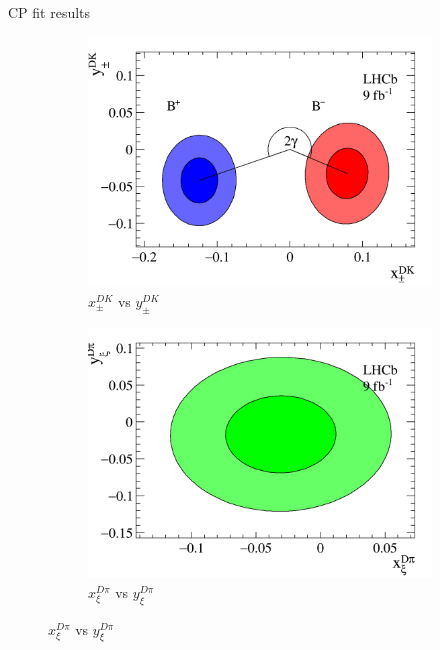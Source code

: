 \documentclass{beamer}
\begin{document}
\begin{frame}{CP fit results}
  \begin{figure}
    \centering
    \vspace{-0.2cm}
    \begin{subfigure}{0.5\textwidth}
      \includegraphics[width = 1.0\textwidth]{Plots/B2DK_CP_Observables_Contours.png}
      \caption{$x_\pm^{DK}$ vs $y_\pm^{DK}$}
    \end{subfigure}%
    \begin{subfigure}{0.5\textwidth}
      \includegraphics[width = 1.0\textwidth]{Plots/B2Dpi_CP_Observables_Contours.png}
      \caption{$x_\xi^{D\pi}$ vs $y_\xi^{D\pi}$}
    \end{subfigure}
  \end{figure}

\end{frame}
\end{document}
